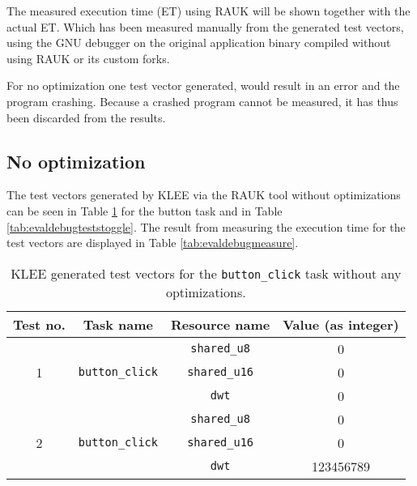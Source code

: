 The measured execution time (ET) using RAUK will be shown together with the
actual ET.  Which has been measured manually from the generated test vectors,
using the GNU debugger on the original application binary compiled without
using RAUK or its custom forks.

For no optimization one test vector generated, would result in an error and the
program crashing. Because a crashed program cannot be measured, it has thus
been discarded from the results.

\subsection{No optimization}
The test vectors generated by KLEE via the RAUK tool without optimizations can
be seen in Table \ref{tab:evaldebugtestsbutton} for the button task and in
Table \ref{tab:evaldebugteststoggle}. The result from measuring the execution
time for the test vectors are displayed in Table \ref{tab:evaldebugmeasure}.

\begin{table}[H]
    \centering
    \begin{longtable}{|c|c|c|c|}
    \hline
    Test no. & Task name & Resource name & Value (as integer) \\ \hline
    \multirow{3}{*}{1} & \multirow{3}{*}{\texttt{button\_click}} & \texttt{shared\_u8}  & 0 \\ \cline{3-4} 
                       &                                         & \texttt{shared\_u16} & 0 \\ \cline{3-4} 
                       &                                         & \texttt{dwt}         & 0 \\ \hline
    \multirow{3}{*}{2} & \multirow{3}{*}{\texttt{button\_click}} & \texttt{shared\_u8}  & 0 \\ \cline{3-4} 
                       &                                         & \texttt{shared\_u16} & 0 \\ \cline{3-4} 
                       &                                         & \texttt{dwt}         & 123456789 \\ \hline
    \end{longtable}
    \caption{KLEE generated test vectors for the \texttt{button\_click} task without any optimizations.}
    \label{tab:evaldebugtestsbutton}
\end{table}


